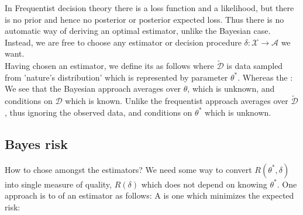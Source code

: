 In Frequentist decision theory there is a loss function and a likelihood, but there
is no prior and hence no posterior or posterior expected loss. Thus there is no 
automatic way of deriving an optimal estimator, unlike the Bayesian case.\\
Instead, we are free to choose any estimator or decision procedure $\delta: \mathcal{X}
\rightarrow \mathcal{A}$ we want.\\
Having chosen an estimator, we define its  as follows
where $\tilde{\mathcal{D}}$ is data sampled from 'nature's distribution' which is 
represented by parameter $\theta^{*}$.
Whereas the : 
We see that the Bayesian approach averages over $\theta$, which is unknown, and conditions
on $\mathcal{D}$ which is known. Unlike the frequentist approach averages over $\tilde{
\mathcal{D}}$, thus ignoring the observed data, and conditions on $\theta^{*}$ which is 
unknown.

\subsection{Bayes risk}
How to chose amongst the estimators? 
We need some way to convert $R(\theta^{*}, \delta)$ into single measure of quality, $R(
\delta)$ which does not depend on knowing $\theta^{*}$. One approach is to   of an estimator as follows:
A  is one which minimizes the
expected risk: 


